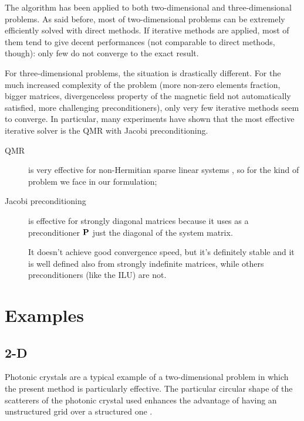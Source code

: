 The algorithm has been applied to both two-dimensional and
three-dimensional problems. As said before, most of two-dimensional
problems can be extremely efficiently solved with direct methods. If
iterative methods are applied, most of them tend to give decent
performances (not comparable to direct methods, though): only few do
not converge to the exact result.

For three-dimensional problems, the situation is drastically
different. For the much increased complexity of the problem (more
non-zero elements fraction, bigger matrices, divergenceless property of
the magnetic field not automatically satisfied, more challenging
preconditioners), only very few iterative methods seem to converge. In
particular, many experiments have shown that the most effective
iterative solver is the QMR with Jacobi preconditioning.

\begin{description}
\item[QMR] is very effective for non-Hermitian sparse linear systems
  \cite{freund_qmr,freund_implementation,freund_iterative,kilmer_qmr},
  so for the kind of problem we face in our formulation;
\item[Jacobi preconditioning] is effective for strongly diagonal
  matrices because it uses as a preconditioner $\mathbf{P}$ just the
  diagonal of the system matrix.

  It doesn't achieve good convergence speed, but it's definitely
  stable and it is well defined also from strongly indefinite
  matrices, while others preconditioners (like the ILU) are not.
\end{description}

\section{Examples}

\subsection{2-D}

Photonic crystals are a typical example of a two-dimensional problem
in which the present method is particularly effective. The particular
circular shape of the scatterers of the photonic crystal used enhances
the advantage of having an unstructured grid over a structured one
\cite{cangellaris_analysis}.

